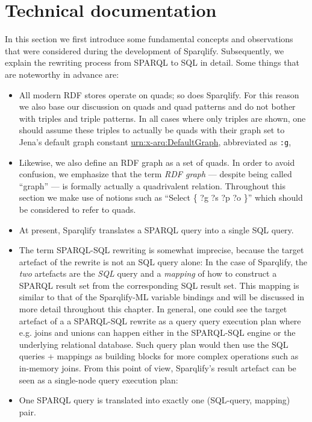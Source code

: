 \documentclass[a4paper,twoside,bibtotoc,abstracton,12pt,BCOR=15mm]{scrreprt}
\begin{document}
\chapter{Technical documentation}
\label{sec:tech-doc}
In this section we first introduce some fundamental concepts and observations that were considered during the development of Sparqlify. 
Subsequently, we explain the rewriting process from SPARQL to SQL in detail.
Some things that are noteworthy in advance are:
\begin{itemize}
  \item All modern RDF stores operate on quads; so does Sparqlify.
		For this reason we also base our discussion on quads and quad patterns and do not bother with triples and triple patterns.
		In all cases where only triples are shown, one should assume these triples to actually be quads with their graph set to Jena's default graph constant
		\url{urn:x-arq:DefaultGraph}, abbreviated as \texttt{:g}, 
  \item Likewise, we also define an RDF graph as a set of quads.
		In order to avoid confusion, we emphasize that the term \emph{RDF graph} --- despite being called ``graph'' --- is formally actually a quadrivalent relation.
        Throughout this section we make use of notions such as ``Select \{ ?g ?s ?p ?o \}'' which should be considered to refer to quads.      
  \item At present, Sparqlify translates a SPARQL query into a single SQL query.
  \item The term SPARQL-SQL rewriting is somewhat imprecise, because the target artefact of the rewrite is not an SQL query alone: In the case of Sparqlify, the \emph{two}
        artefacts are the \emph{SQL} query and a \emph{mapping} of how to construct a SPARQL result set from the corresponding SQL result set.
        This mapping is similar to that of the Sparqlify-ML variable bindings and will be discussed in more detail throughout this chapter.
        In general, one could see the target artefact of a a SPARQL-SQL rewrite as a query query execution plan where e.g. joins and unions can happen either in the SPARQL-SQL engine or the underlying relational database.
        Such query plan would then use the SQL queries + mappings as building blocks for more complex operations such as in-memory joins.
        From this point of view, Sparqlify's result artefact can be seen as a single-node query execution plan:
   \item One SPARQL query is translated into exactly one (SQL-query, mapping) pair.
\end{itemize}
\end{document}
